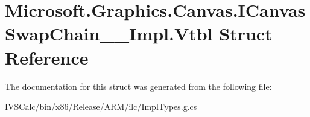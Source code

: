 \hypertarget{struct_microsoft_1_1_graphics_1_1_canvas_1_1_i_canvas_swap_chain_____impl_1_1_vtbl}{}\section{Microsoft.\+Graphics.\+Canvas.\+I\+Canvas\+Swap\+Chain\+\_\+\+\_\+\+Impl.\+Vtbl Struct Reference}
\label{struct_microsoft_1_1_graphics_1_1_canvas_1_1_i_canvas_swap_chain_____impl_1_1_vtbl}


The documentation for this struct was generated from the following file\+:\begin{DoxyCompactItemize}
\item 
I\+V\+S\+Calc/bin/x86/\+Release/\+A\+R\+M/ilc/Impl\+Types.\+g.\+cs\end{DoxyCompactItemize}
